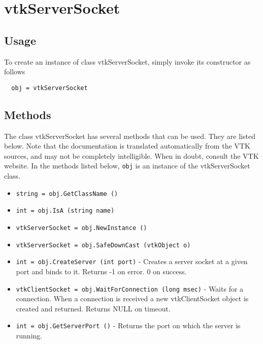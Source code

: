 \section{vtkServerSocket}

\subsection{Usage}



To create an instance of class vtkServerSocket, simply
invoke its constructor as follows
\begin{verbatim}
  obj = vtkServerSocket
\end{verbatim}
\subsection{Methods}

The class vtkServerSocket has several methods that can be used.
  They are listed below.
Note that the documentation is translated automatically from the VTK sources,
and may not be completely intelligible.  When in doubt, consult the VTK website.
In the methods listed below, \verb|obj| is an instance of the vtkServerSocket class.
\begin{itemize}
\item  \verb|string = obj.GetClassName ()|

\item  \verb|int = obj.IsA (string name)|

\item  \verb|vtkServerSocket = obj.NewInstance ()|

\item  \verb|vtkServerSocket = obj.SafeDownCast (vtkObject o)|

\item  \verb|int = obj.CreateServer (int port)| -  Creates a server socket at a given port and binds to it.
 Returns -1 on error. 0 on success.

\item  \verb|vtkClientSocket = obj.WaitForConnection (long msec)| -  Waits for a connection. When a connection is received
 a new vtkClientSocket object is created and returned.
 Returns NULL on timeout. 

\item  \verb|int = obj.GetServerPort ()| -  Returns the port on which the server is running.

\end{itemize}

